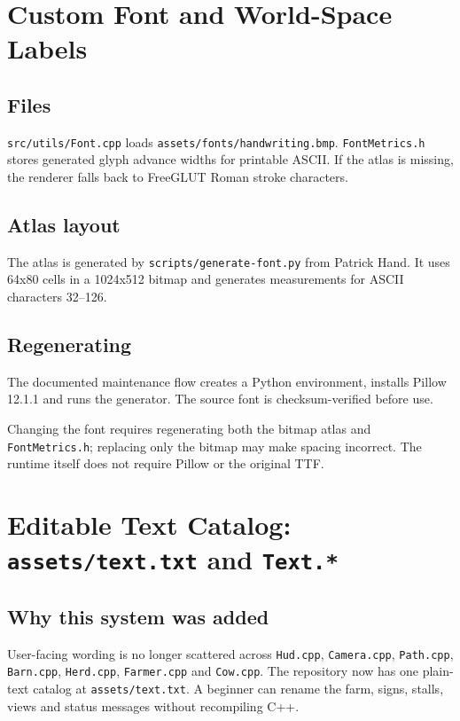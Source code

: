 \documentclass[11pt,a4paper,openany]{book}
\newcommand{\file}[1]{\nolinkurl{#1}}
\begin{document}
\chapter{Custom Font and World-Space Labels}
\section{Files}
\file{src/utils/Font.cpp} loads \file{assets/fonts/handwriting.bmp}. \file{FontMetrics.h} stores generated glyph advance widths for printable ASCII. If the atlas is missing, the renderer falls back to FreeGLUT Roman stroke characters.

\section{Atlas layout}
The atlas is generated by \file{scripts/generate-font.py} from Patrick Hand. It uses 64x80 cells in a 1024x512 bitmap and generates measurements for ASCII characters 32--126.

\section{Regenerating}
The documented maintenance flow creates a Python environment, installs Pillow 12.1.1 and runs the generator. The source font is checksum-verified before use.

\begin{editbox}
	Changing the font requires regenerating both the bitmap atlas and \file{FontMetrics.h}; replacing only the bitmap may make spacing incorrect. The runtime itself does not require Pillow or the original TTF.
\end{editbox}


\chapter{Editable Text Catalog: \texttt{assets/text.txt} and \texttt{Text.*}}
\section{Why this system was added}
User-facing wording is no longer scattered across \file{Hud.cpp}, \file{Camera.cpp}, \file{Path.cpp}, \file{Barn.cpp}, \file{Herd.cpp}, \file{Farmer.cpp} and \file{Cow.cpp}. The repository now has one plain-text catalog at \file{assets/text.txt}. A beginner can rename the farm, signs, stalls, views and status messages without recompiling C++.
\end{document}

